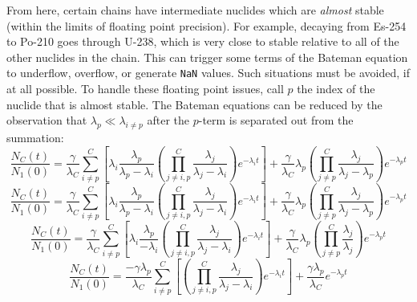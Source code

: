 \documentclass[letterpaper]{physor2018}
\begin{document}
From here, certain chains have intermediate nuclides which are \emph{almost} stable
(within the limits of floating point precision). For example, decaying
from Es-254 to Po-210 goes through U-238, which is very close to stable relative to all of the
other nuclides in the chain. This can trigger some terms of the Bateman equation to
underflow, overflow, or generate \texttt{NaN} values. Such situations must be avoided,
if at all possible. To handle these floating point issues, call $p$ the index of the nuclide
that is almost stable. The Bateman equations can be reduced by the
observation that $\lambda_p \ll \lambda_{i\ne p}$ after the $p$-term is separated out
from the summation:
\begin{equation}
\label{almost-stable-0}
\frac{N_C(t)}{N_1(0)} = \frac{\gamma}{\lambda_C}\sum_{i\ne p}^C \left[\lambda_i \frac{\lambda_p}{\lambda_p - \lambda_i}
                                                    \left(\prod_{j\ne i,p}^C \frac{\lambda_j}{\lambda_j - \lambda_i}\right)
                                                    e^{-\lambda_i t}\right]
                       + \frac{\gamma}{\lambda_C} \lambda_p \left(\prod_{j\ne p}^C \frac{\lambda_j}{\lambda_j - \lambda_p} \right) e^{-\lambda_p t}
\end{equation}
\begin{equation}
\label{almost-stable-1}
\frac{N_C(t)}{N_1(0)} = \frac{\gamma}{\lambda_C}\sum_{i\ne p}^C \left[\lambda_i \frac{\lambda_p}{\lambda_p - \lambda_i}
                                                    \left(\prod_{j\ne i,p}^C \frac{\lambda_j}{\lambda_j - \lambda_i}\right)
                                                    e^{-\lambda_i t}\right]
                       + \frac{\gamma}{\lambda_C} \lambda_p \left(\prod_{j\ne p}^C \frac{\lambda_j}{\lambda_j - \lambda_p}\right) e^{-\lambda_p t}
\end{equation}
\begin{equation}
\label{almost-stable-2}
   \frac{N_C(t)}{N_1(0)} = \frac{\gamma}{\lambda_C}\sum_{i\ne p}^C \left[\lambda_i \frac{\lambda_p}{- \lambda_i}
                                                        \left(\prod_{j\ne i,p}^C \frac{\lambda_j}{\lambda_j - \lambda_i}\right)
                                                        e^{-\lambda_i t}\right]
                           + \frac{\gamma}{\lambda_C} \lambda_p \left(\prod_{j\ne p}^C \frac{\lambda_j}{\lambda_j}\right) e^{-\lambda_p t}
\end{equation}
\begin{equation}
\label{almost-stable-3}
   \frac{N_C(t)}{N_1(0)} = \frac{-\gamma\lambda_p}{\lambda_C}\sum_{i\ne p}^C \left[
                                                        \left(\prod_{j\ne i,p}^C \frac{\lambda_j}{\lambda_j - \lambda_i}\right)
                                                        e^{-\lambda_i t}\right]
                           + \frac{\gamma\lambda_p}{\lambda_C} e^{-\lambda_p t}
\end{equation}
\end{document}
